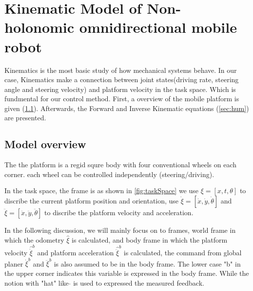 \chapter{Kinematic Model of Non-holonomic omnidirectional mobile robot}
\label{cha:Kinematic}

Kinematics is the most basic study of how mechanical systems behave. In our case, Kinematics make a connection between joint states(driving rate, steering angle and steering velocity) and platform velocity in the 
task space. Which is fundmental for our control method.
First, a overview of the mobile platform is given (\cref{sec:model_overview}).
Afterwards, the Forward and Inverse Kinematic equations (\cref{sec:hum}) are presented.

\section{Model overview}
\label{sec:model_overview}

The the platform is a regid squre body with four conventional wheels on each corner. each wheel can be controlled independently (steering/driving).

In the task space, the frame is as shown in \cref{fig:taskSpace} we use $ \xi = [x,t,\theta]$ to discribe the current platform position and orientation, use $ \dot{\xi} = [\dot{x},\dot{y},\dot{\theta}] $ and 
$ \ddot{\xi}= [\ddot{x},\ddot{y},\ddot{\theta}] $ to discribe the platform velocity and acceleration. 

In the following discussion, we will mainly focus on to frames, world frame in which the odometry $ \hat{\xi} $ is calculated, and body frame in which the platform velocity $\hat{\dot{\xi}}^b$ and platform 
acceleration $ \hat{\ddot{\xi}}^b $ is calculated, the command from global planer $ \dot{\xi}^b $ and $ \ddot{\xi}^b $ is also assumed to be in the body frame. The lower case "b" in the upper corner indicates 
this variable is expressed in the body frame. While the notion with "hat" like $\hat{}$ is used to expressed the measured feedback.

